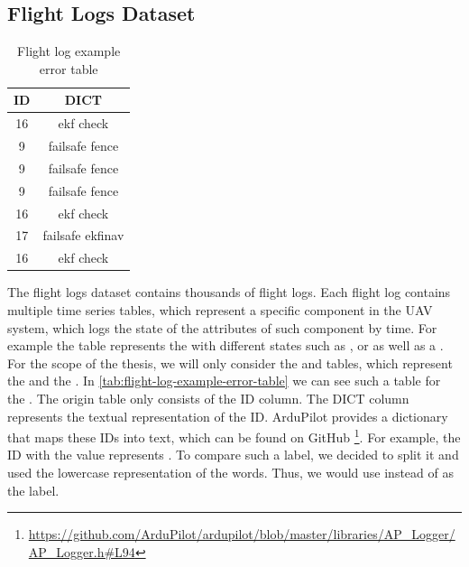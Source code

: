 \subsection{Flight Logs Dataset}\label{subsec:flight-logs-dataset}
\begin{table}
    \begin{center}
        \label{fig:verb-list}
        \begin{tabular}{||c c||}
            \hline
            ID & DICT \\ [0.5ex]
            \hline\hline
            16 & ekf check        \\
            \hline
            9  & failsafe fence   \\
            \hline
            9  & failsafe fence   \\
            \hline
            9  & failsafe fence   \\
            \hline
            16 & ekf check        \\
            \hline
            17 & failsafe ekfinav \\
            \hline
            16 & ekf check \\ [1ex]
            \hline
        \end{tabular}
    \end{center}
    \caption{\label{tab:flight-log-example-error-table}Flight log example error table}
\end{table}
The flight logs dataset contains thousands of flight logs.
Each flight log contains multiple time series tables, which represent a specific component in the UAV system, which logs the state of the attributes of such component by time.
For example the table  represents the  with different states such as ,   or   as well as a .
For the scope of the thesis, we will only consider the  and  tables, which represent the   and the .
In \autoref{tab:flight-log-example-error-table} we can see such a table for the .
The origin table only consists of the ID column.
The DICT column represents the textual representation of the ID. ArduPilot provides a dictionary that maps these IDs into text, which can be found on GitHub \footnote{\url{https://github.com/ArduPilot/ardupilot/blob/master/libraries/AP\_Logger/AP\_Logger.h\#L94}}.
For example, the ID with the value  represents .
To compare such a label, we decided to split it and used the lowercase representation of the words.
Thus, we would use  instead of  as the label.

